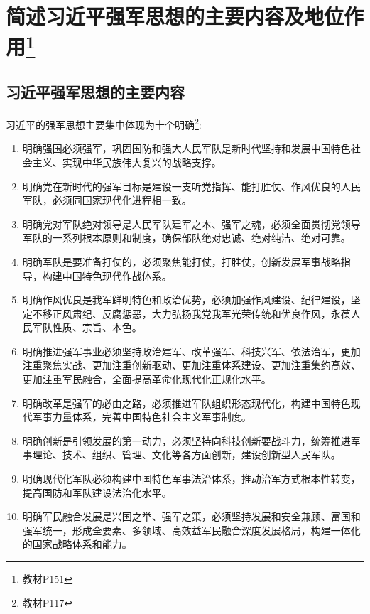 \documentclass[lang=cn,newtx,12pt,scheme=chinese]{elegantbook}
\begin{document}




\chapter{简述习近平强军思想的主要内容及地位作用\footnote{教材P151}}
\section{习近平强军思想的主要内容}
习近平的强军思想主要集中体现为十个明确\footnote{教材P117}:

\begin{enumerate}
  \item 明确强国必须强军，巩固国防和强大人民军队是新时代坚持和发展中国特色社会主义、实现中华民族伟大复兴的战略支撑。
  \item 明确党在新时代的强军目标是建设一支听党指挥、能打胜仗、作风优良的人民军队，必须同国家现代化进程相一致。
  \item 明确党对军队绝对领导是人民军队建军之本、强军之魂，必须全面贯彻党领导军队的一系列根本原则和制度，确保部队绝对忠诚、绝对纯洁、绝对可靠。
  \item 明确军队是要准备打仗的，必须聚焦能打仗，打胜仗，创新发展军事战略指导，构建中国特色现代作战体系。
  \item 明确作风优良是我军鲜明特色和政治优势，必须加强作风建设、纪律建设，坚定不移正风肃纪、反腐惩恶，大力弘扬我党我军光荣传统和优良作风，永葆人民军队性质、宗旨、本色。
  \item 明确推进强军事业必须坚持政治建军、改革强军、科技兴军、依法治军，更加注重聚焦实战、更加注重创新驱动、更加注重体系建设、更加注重集约高效、更加注重军民融合，全面提高革命化现代化正规化水平。
  \item 明确改革是强军的必由之路，必须推进军队组织形态现代化，构建中国特色现代军事力量体系，完善中国特色社会主义军事制度。
  \item 明确创新是引领发展的第一动力，必须坚持向科技创新要战斗力，统筹推进军事理论、技术、组织、管理、文化等各方面创新，建设创新型人民军队。
  \item 明确现代化军队必须构建中国特色军事法治体系，推动治军方式根本性转变，提高国防和军队建设法治化水平。
  \item 明确军民融合发展是兴国之举、强军之策，必须坚持发展和安全兼顾、富国和强军统一，形成全要素、多领域、高效益军民融合深度发展格局，构建一体化的国家战略体系和能力。
\end{enumerate}
\end{document}
